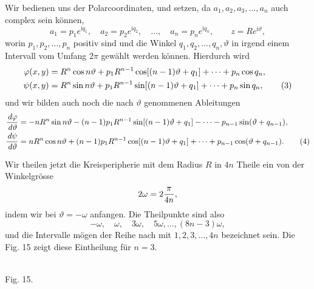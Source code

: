 \documentclass[11pt]{article}
\providecommand{\dd}{\,d}
\providecommand{\ii}{\mathrm{i}}
\begin{document}
Wir bedienen uns der Polarcoordinaten, und setzen, da $a_1,a_2,a_3,\ldots,a_n$ auch complex sein können,
\[
        a_1=p_1e^{\ii q_1},\quad a_2=p_2e^{\ii q_2},\quad\ldots,\quad a_n=p_ne^{\ii q_n},
        \qquad z=Re^{\ii\vartheta},
\]
worin $p_1,p_2,\ldots,p_n$ positiv sind und die Winkel $q_1,q_2,\ldots,q_n,\vartheta$ in irgend einem Intervall vom Umfang $2\pi$ gewählt werden können. Hierdurch wird
\begin{align}
\varphi(x,y)&=R^n\cos n\vartheta+p_1R^{n-1}\cos[(n-1)\vartheta+q_1]+\cdots+p_n\cos q_n,\notag\\
\psi(x,y)&=R^n\sin n\vartheta+p_1R^{n-1}\sin[(n-1)\vartheta+q_1]+\cdots+p_n\sin q_n,
\tag{3}
\end{align}
und wir bilden auch noch die nach $\vartheta$ genommenen Ableitungen
\begin{align}
{\dd\varphi\over\dd\vartheta}
&=-nR^n\sin n\vartheta-(n-1)p_1R^{n-1}\sin[(n-1)\vartheta+q_1]
   -\cdots-p_{n-1}\sin(\vartheta+q_{n-1}),\notag\\
{\dd\psi\over\dd\vartheta}
&=nR^n\cos n\vartheta+(n-1)p_1R^{n-1}\cos[(n-1)\vartheta+q_1]
  +\cdots+p_{n-1}\cos(\vartheta+q_{n-1}).
\tag{4}
\end{align}

Wir theilen jetzt die Kreisperipherie mit dem Radius $R$ in $4n$ Theile ein von der Winkelgrösse
\[
        2\omega=2{\pi\over 4n},
\]
indem wir bei $\vartheta=-\omega$ anfangen. Die Theilpunkte sind also
\[
        -\omega,\quad \omega,\quad 3\omega,\quad 5\omega,\ldots,(8n-3)\omega,
\]
und die Intervalle mögen der Reihe nach mit $1,2,3,\ldots,4n$ bezeichnet sein. Die Fig. 15 zeigt diese Eintheilung für $n=3$.


\begin{center}
\\[-0.2em]
{\small Fig. 15.}
\end{center}
\end{document}
